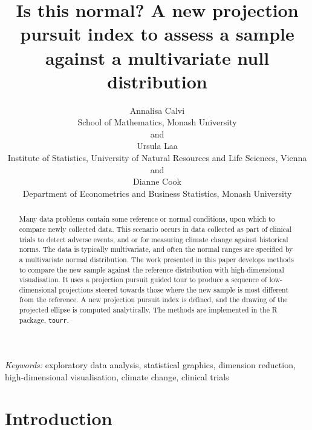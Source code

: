 \documentclass[
  12pt]{article}
\begin{document}
\def\spacingset#1{\renewcommand{\baselinestretch}%
{#1}\small\normalsize} \spacingset{1}



\title{\bf Is this normal? A new projection pursuit index to assess a
sample against a multivariate null distribution}
\author{
Annalisa Calvi\\
School of Mathematics, Monash University\\
and\\Ursula Laa\\
Institute of Statistics, University of Natural Resources and Life
Sciences, Vienna\\
and\\Dianne Cook\\
Department of Econometrics and Business Statistics, Monash University\\
}
\maketitle

\bigskip
\bigskip
\begin{abstract}
Many data problems contain some reference or normal conditions, upon
which to compare newly collected data. This scenario occurs in data
collected as part of clinical trials to detect adverse events, and or
for measuring climate change against historical norms. The data is
typically multivariate, and often the normal ranges are specified by a
multivariate normal distribution. The work presented in this paper
develops methods to compare the new sample against the reference
distribution with high-dimensional visualisation. It uses a projection
pursuit guided tour to produce a sequence of low-dimensional projections
steered towards those where the new sample is most different from the
reference. A new projection pursuit index is defined, and the drawing of
the projected ellipse is computed analytically. The methods are
implemented in the R package, \texttt{tourr}.
\end{abstract}

\noindent%
{\it Keywords:} exploratory data analysis, statistical
graphics, dimension reduction, high-dimensional visualisation, climate
change, clinical trials
\vfill

\newpage
\spacingset{1.9} %

\section{Introduction}\label{introduction}
\end{document}
